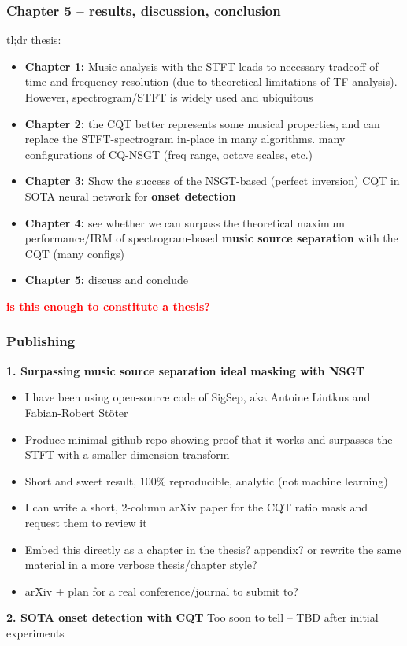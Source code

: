 \documentclass[usenames,dvipsnames]{beamer}
\begin{document}
\begin{frame}
	\frametitle{Chapter 5 -- results, discussion, conclusion}
	tl;dr thesis:
	\begin{itemize}
		\item
			\textbf{Chapter 1:} Music analysis with the STFT leads to necessary tradeoff of time and frequency resolution (due to theoretical limitations of TF analysis). However, spectrogram/STFT is widely used and ubiquitous
		\item
			\textbf{Chapter 2:} the CQT better represents some musical properties, and can replace the STFT-spectrogram in-place in many algorithms. many configurations of CQ-NSGT (freq range, octave scales, etc.)
		\item
			\textbf{Chapter 3:} Show the success of the NSGT-based (perfect inversion) CQT in SOTA neural network for \textbf{onset detection}
		\item
			\textbf{Chapter 4:} see whether we can surpass the theoretical maximum performance/IRM of spectrogram-based \textbf{music source separation} with the CQT (many configs)
		\item
			\textbf{Chapter 5:} discuss and conclude
	\end{itemize}
	\textcolor{red}{\textbf{is this enough to constitute a thesis?}}
\end{frame}

\begin{frame}
	\frametitle{Publishing}
	\textbf{1. Surpassing music source separation ideal masking with NSGT}
	\begin{itemize}
		\item
			I have been using open-source code of SigSep, aka Antoine Liutkus and Fabian-Robert St{\"o}ter
		\item
			Produce minimal github repo showing proof that it works and surpasses the STFT with a smaller dimension transform
		\item
			Short and sweet result, 100\% reproducible, analytic (not machine learning)
		\item
			I can write a short, 2-column arXiv paper for the CQT ratio mask and request them to review it
		\item
			Embed this directly as a chapter in the thesis? appendix? or rewrite the same material in a more verbose thesis/chapter style?
		\item
			arXiv + plan for a real conference/journal to submit to?
	\end{itemize}
	\textbf{2. SOTA onset detection with CQT}
	Too soon to tell -- TBD after initial experiments
\end{frame}
\end{document}

